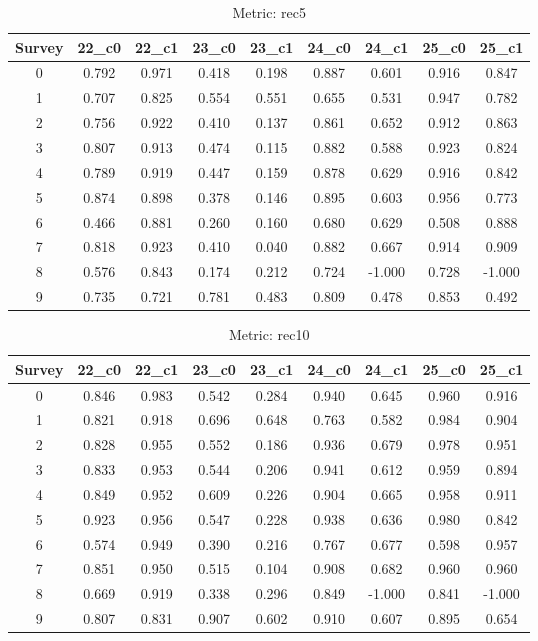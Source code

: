 \documentclass{article}
\begin{document}
\begin{table}[tbh]
\begin{center}
\begin{tabular}{|*{9}{c|}}
\hline
 Survey & 22\_c0 & 22\_c1 & 23\_c0 & 23\_c1 & 24\_c0 & 24\_c1 & 25\_c0 & 25\_c1 \\ 
\hline
0 & 0.792 & 0.971 & 0.418 & 0.198 & 0.887 & 0.601 & 0.916 & 0.847 \\ 
1 & 0.707 & 0.825 & 0.554 & 0.551 & 0.655 & 0.531 & 0.947 & 0.782 \\ 
2 & 0.756 & 0.922 & 0.410 & 0.137 & 0.861 & 0.652 & 0.912 & 0.863 \\ 
3 & 0.807 & 0.913 & 0.474 & 0.115 & 0.882 & 0.588 & 0.923 & 0.824 \\ 
4 & 0.789 & 0.919 & 0.447 & 0.159 & 0.878 & 0.629 & 0.916 & 0.842 \\ 
5 & 0.874 & 0.898 & 0.378 & 0.146 & 0.895 & 0.603 & 0.956 & 0.773 \\ 
6 & 0.466 & 0.881 & 0.260 & 0.160 & 0.680 & 0.629 & 0.508 & 0.888 \\ 
7 & 0.818 & 0.923 & 0.410 & 0.040 & 0.882 & 0.667 & 0.914 & 0.909 \\ 
8 & 0.576 & 0.843 & 0.174 & 0.212 & 0.724 & -1.000 & 0.728 & -1.000 \\ 
9 & 0.735 & 0.721 & 0.781 & 0.483 & 0.809 & 0.478 & 0.853 & 0.492 \\ 
\hline
\end{tabular}
\end{center}
\caption{Metric: rec5}
\end{table}


\begin{table}[tbh]
\begin{center}
\begin{tabular}{|*{9}{c|}}
\hline
 Survey & 22\_c0 & 22\_c1 & 23\_c0 & 23\_c1 & 24\_c0 & 24\_c1 & 25\_c0 & 25\_c1 \\ 
\hline
0 & 0.846 & 0.983 & 0.542 & 0.284 & 0.940 & 0.645 & 0.960 & 0.916 \\ 
1 & 0.821 & 0.918 & 0.696 & 0.648 & 0.763 & 0.582 & 0.984 & 0.904 \\ 
2 & 0.828 & 0.955 & 0.552 & 0.186 & 0.936 & 0.679 & 0.978 & 0.951 \\ 
3 & 0.833 & 0.953 & 0.544 & 0.206 & 0.941 & 0.612 & 0.959 & 0.894 \\ 
4 & 0.849 & 0.952 & 0.609 & 0.226 & 0.904 & 0.665 & 0.958 & 0.911 \\ 
5 & 0.923 & 0.956 & 0.547 & 0.228 & 0.938 & 0.636 & 0.980 & 0.842 \\ 
6 & 0.574 & 0.949 & 0.390 & 0.216 & 0.767 & 0.677 & 0.598 & 0.957 \\ 
7 & 0.851 & 0.950 & 0.515 & 0.104 & 0.908 & 0.682 & 0.960 & 0.960 \\ 
8 & 0.669 & 0.919 & 0.338 & 0.296 & 0.849 & -1.000 & 0.841 & -1.000 \\ 
9 & 0.807 & 0.831 & 0.907 & 0.602 & 0.910 & 0.607 & 0.895 & 0.654 \\ 
\hline
\end{tabular}
\end{center}
\caption{Metric: rec10}
\end{table}
\end{document}
